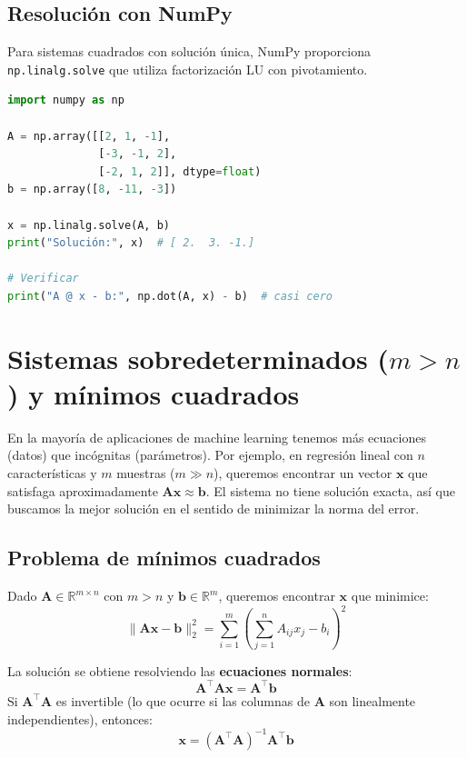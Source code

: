 \documentclass[12pt,a4paper,openany,oneside]{book}
\begin{document}
\subsection{Resolución con NumPy}
Para sistemas cuadrados con solución única, NumPy proporciona \texttt{np.linalg.solve} que utiliza factorización LU con pivotamiento.

\begin{lstlisting}[language=Python]
import numpy as np

A = np.array([[2, 1, -1],
              [-3, -1, 2],
              [-2, 1, 2]], dtype=float)
b = np.array([8, -11, -3])

x = np.linalg.solve(A, b)
print("Solución:", x)  # [ 2.  3. -1.]

# Verificar
print("A @ x - b:", np.dot(A, x) - b)  # casi cero
\end{lstlisting}

\section{Sistemas sobredeterminados ($m > n$) y mínimos cuadrados}

En la mayoría de aplicaciones de machine learning tenemos más ecuaciones (datos) que incógnitas (parámetros). Por ejemplo, en regresión lineal con $n$ características y $m$ muestras ($m \gg n$), queremos encontrar un vector $\mathbf{x}$ que satisfaga aproximadamente $\mathbf{A}\mathbf{x} \approx \mathbf{b}$. El sistema no tiene solución exacta, así que buscamos la mejor solución en el sentido de minimizar la norma del error.

\subsection{Problema de mínimos cuadrados}
Dado $\mathbf{A} \in \mathbb{R}^{m \times n}$ con $m > n$ y $\mathbf{b} \in \mathbb{R}^m$, queremos encontrar $\mathbf{x}$ que minimice:
\begin{equation*}
\|\mathbf{A}\mathbf{x} - \mathbf{b}\|_2^2 = \sum_{i=1}^{m} \left( \sum_{j=1}^{n} A_{ij}x_j - b_i \right)^2
\end{equation*}

La solución se obtiene resolviendo las \textbf{ecuaciones normales}:
\begin{equation*}
\mathbf{A}^\top \mathbf{A} \mathbf{x} = \mathbf{A}^\top \mathbf{b}
\end{equation*}
Si $\mathbf{A}^\top \mathbf{A}$ es invertible (lo que ocurre si las columnas de $\mathbf{A}$ son linealmente independientes), entonces:
\begin{equation*}
\mathbf{x} = (\mathbf{A}^\top \mathbf{A})^{-1} \mathbf{A}^\top \mathbf{b}
\end{equation*}
\end{document}
